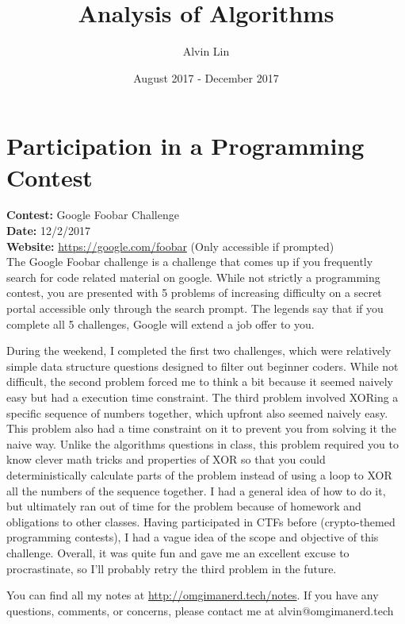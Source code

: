 \documentclass{math}
\title{Analysis of Algorithms}
\author{Alvin Lin}
\date{August 2017 - December 2017}
\begin{document}
\maketitle

\section*{Participation in a Programming Contest}
\textbf{Contest:} Google Foobar Challenge \\
\textbf{Date:} 12/2/2017 \\
\textbf{Website:} \url{https://google.com/foobar}
(Only accessible if prompted) \\
The Google Foobar challenge is a challenge that comes up if you frequently
search for code related material on google. While not strictly a programming
contest, you are presented with 5 problems of increasing difficulty on a secret
portal accessible only through the search prompt. The legends say that if you
complete all 5 challenges, Google will extend a job offer to you. \par
During the weekend, I completed the first two challenges, which were relatively
simple data structure questions designed to filter out beginner coders. While
not difficult, the second problem forced me to think a bit because it seemed
naively easy but had a execution time constraint. The third problem involved
XORing a specific sequence of numbers together, which upfront also seemed
naively easy. This problem also had a time constraint on it to prevent you from
solving it the naive way. Unlike the algorithms questions in class, this problem
required you to know clever math tricks and properties of XOR so that you could
deterministically calculate parts of the problem instead of using a loop to XOR
all the numbers of the sequence together. I had a general idea of how to do it,
but ultimately ran out of time for the problem because of homework and
obligations to other classes. Having participated in CTFs before (crypto-themed
programming contests), I had a vague idea of the scope and objective of this
challenge. Overall, it was quite fun and gave me an excellent excuse to
procrastinate, so I'll probably retry the third problem in the future.

\begin{center}
  You can find all my notes at \url{http://omgimanerd.tech/notes}. If you have
  any questions, comments, or concerns, please contact me at
  alvin@omgimanerd.tech
\end{center}
\end{document}
